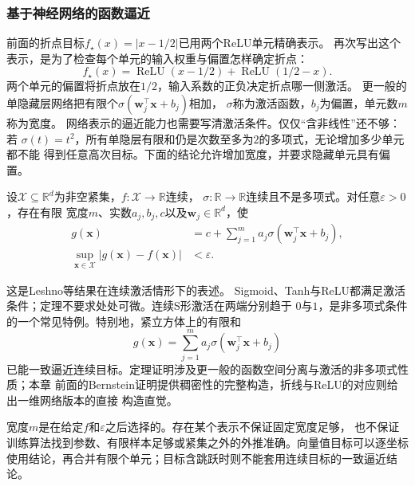 \subsubsection{基于神经网络的函数逼近}
\label{sec:functional-neural-approximation}

前面的折点目标$f_\star(x)=|x-1/2|$已用两个ReLU单元精确表示。
再次写出这个表示，是为了检查每个单元的输入权重与偏置怎样确定折点：
\[
 f_\star(x)=\operatorname{ReLU}(x-1/2)+\operatorname{ReLU}(1/2-x).
\]
两个单元的偏置将折点放在$1/2$，输入系数的正负决定折点哪一侧激活。
更一般的单隐藏层网络把有限个$\sigma(\bm w_j^\top\bm x+b_j)$相加，
$\sigma$称为激活函数，$b_j$为偏置，单元数$m$称为宽度。
网络表示的逼近能力也需要写清激活条件。仅仅“含非线性”还不够：若
$\sigma(t)=t^2$，所有单隐层有限和仍是次数至多为$2$的多项式，无论增加多少单元都不能
得到任意高次目标。下面的结论允许增加宽度，并要求隐藏单元具有偏置。

\begin{theorem}[单隐藏层的通用逼近]
\label{thm:functional-universal-approximation}
设$\mathcal X\subseteq\mathbb R^d$为非空紧集，$f:\mathcal X\to\mathbb R$连续，
$\sigma:\mathbb R\to\mathbb R$连续且不是多项式。对任意$\varepsilon>0$，存在有限
宽度$m$、实数$a_j,b_j,c$以及$\bm w_j\in\mathbb R^d$，使
\begin{equation}
 \begin{aligned}
 g(\bm x)&=c+\sum_{j=1}^m a_j\sigma(\bm w_j^{\top}\bm x+b_j),\\
 \sup_{\bm x\in\mathcal X}|g(\bm x)-f(\bm x)|&<\varepsilon.
 \end{aligned}
 \label{eq:functional-universal-approximation}
\end{equation}
\end{theorem}

这是Leshno等结果在连续激活情形下的表述。
Sigmoid、Tanh与ReLU都满足激活条件；定理不要求处处可微。连续S形激活在两端分别趋于
$0$与$1$，是非多项式条件的一个常见特例。特别地，紧立方体上的有限和
\begin{equation}
 g(\bm x)=\sum_{j=1}^m a_j\sigma(\bm w_j^{\top}\bm x+b_j)
 \label{eq:functional-sigmoidal-network}
\end{equation}
已能一致逼近连续目标。定理证明涉及更一般的函数空间分离与激活的非多项式性质；本章
前面的Bernstein证明提供稠密性的完整构造，折线与ReLU的对应则给出一维网络版本的直接
构造直觉。

宽度$m$是在给定$f$和$\varepsilon$之后选择的。存在某个表示不保证固定宽度足够，
也不保证训练算法找到参数、有限样本足够或紧集之外的外推准确。向量值目标可以逐坐标
使用结论，再合并有限个单元；目标含跳跃时则不能套用连续目标的一致逼近结论。

